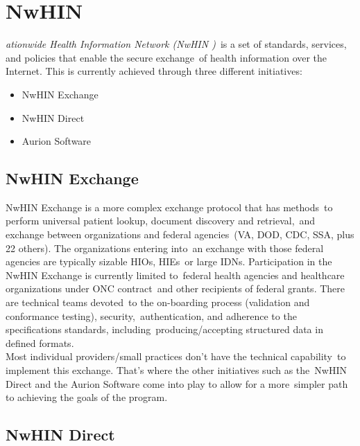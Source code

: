   \section[Nationwide Health Information Network (NwHIN)]{NwHIN}
  \label{sec:nwhin}

  \textit{ationwide Health Information Network (NwHIN )}\
  is a set of standards, services, and policies that enable the secure exchange\
  of health information over the Internet.\citep{_nwhin_framework_2013}
 This is currently achieved through three different initiatives:\
  \begin{itemize}
    \itemsep0ex
    \item  NwHIN Exchange
    \item  NwHIN Direct 
    \item Aurion Software
  \end{itemize}

  \subsection{NwHIN Exchange}

 	NwHIN Exchange is a more complex exchange protocol that has methods\
to perform universal patient lookup, document discovery and retrieval,\
 and exchange between organizations and federal agencies\
 (VA, DOD, CDC, SSA, plus 22 others). The organizations entering into\
 an exchange with those federal agencies are typically sizable HIOs, HIEs\
or large IDNs. Participation in the NwHIN Exchange is currently limited to\
federal health agencies and healthcare organizations under ONC contract\
 and other recipients of federal grants. There are technical teams devoted\
 to the on-boarding process (validation and conformance testing), security,\
 authentication, and adherence to the specifications standards, including\
 producing/accepting structured data in defined formats.\
\citep{_nwhin_exchange_2013}\\

  	Most individual providers/small practices don't have the technical capability\
 to implement this exchange. That's where the other initiatives such as the\
NwHIN Direct and the Aurion Software come into play to allow for a more\
 simpler path to achieving the goals of the program.\\

 \subsection{NwHIN Direct}

